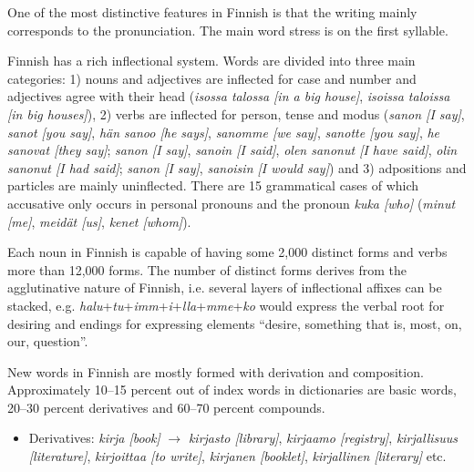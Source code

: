 \documentclass{../../metanetpaper}
\begin{document}
\begin{Parallel}[c]{79mm}{78mm}
{One of the most distinctive features in Finnish is that the writing mainly
corresponds to the pronunciation. The main word stress is on the first
syllable.


Finnish has a rich inflectional system. Words are divided into three main
categories: 1) nouns and adjectives are inflected for case and number and
adjectives agree with their head
(\textit{\foreignlanguage{finnish}{\textit{isossa talossa}} [in a big house]},
 \textit{\foreignlanguage{finnish}{\textit{isoissa taloissa}}
         [in big houses]}),
2) verbs are inflected for person, tense and modus
(\textit{\foreignlanguage{finnish}{\textit{sanon}} [I say]},
 \textit{\foreignlanguage{finnish}{\textit{sanot}} [you say]},
 \textit{\foreignlanguage{finnish}{\textit{hän sanoo}} [he says]},
 \textit{\foreignlanguage{finnish}{\textit{sanomme}} [we say]},
 \textit{\foreignlanguage{finnish}{\textit{sanotte}} [you say]},
 \textit{\foreignlanguage{finnish}{\textit{he sanovat}} [they say]};
 \textit{\foreignlanguage{finnish}{\textit{sanon}} [I say]},
 \textit{\foreignlanguage{finnish}{\textit{sanoin}} [I said]},
 \textit{\foreignlanguage{finnish}{\textit{olen sanonut}} [I have said]},
 \textit{\foreignlanguage{finnish}{\textit{olin sanonut}} [I had said]};
 \textit{\foreignlanguage{finnish}{\textit{sanon}} [I say]},
 \textit{\foreignlanguage{finnish}{\textit{sanoisin}} [I would say]})
 and 3) adpositions and particles are mainly uninflected. There are 15
grammatical cases of which accusative only occurs in personal pronouns and the
pronoun
\textit{\foreignlanguage{finnish}{\textit{kuka}} [who]} %
 (\textit{\foreignlanguage{finnish}{\textit{minut}} [me]},
  \textit{\foreignlanguage{finnish}{\textit{meidät}} [us]},
  \textit{\foreignlanguage{finnish}{\textit{kenet}} [whom]}).

Each noun in Finnish is capable of having some 2,000 distinct forms
and verbs more than 12,000 forms. The number of distinct forms derives
from the agglutinative nature of Finnish, i.e. several layers of
inflectional affixes can be stacked,
e.g. \textit{halu}+\textit{tu}+\textit{imm}+\textit{i}+\textit{lla}+\textit{mme}+\textit{ko}
would express the verbal root for desiring and endings for expressing
elements “desire, something that is, most, on, our, question”.

New words in Finnish are mostly formed with derivation and composition.
Approximately 10–15 percent out of index words in dictionaries are basic words,
20–30 percent derivatives and 60–70 percent compounds.
\begin{itemize}
\item Derivatives:
   \textit{\foreignlanguage{finnish}{\textit{kirja}} [book]} $\to$
   \textit{\foreignlanguage{finnish}{\textit{kirjasto}} [library]},
   \textit{\foreignlanguage{finnish}{\textit{kirjaamo}} [registry]},
   \textit{\foreignlanguage{finnish}{\textit{kirjallisuus}} [literature]},
   \textit{\foreignlanguage{finnish}{\textit{kirjoittaa}} [to write]},
   \textit{\foreignlanguage{finnish}{\textit{kirjanen}} [booklet]},
   \textit{\foreignlanguage{finnish}{\textit{kirjallinen}} [literary]} etc.


\end{itemize}}
\end{Parallel}
\end{document}
